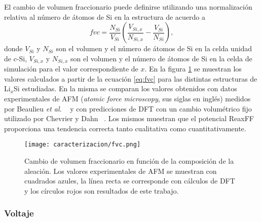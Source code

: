 El cambio de volumen fraccionario puede definirse utilizando una normalización 
relativa al número de átomos de Si en la estructura de acuerdo a
\begin{equation}\label{eq:fvc}
    fvc = \frac{N_{Si}}{V_{Si}} \left( \frac{V_{Si,x}}{N_{Si,x}} - \frac{V_{Si}}{N_{Si}} \right),
\end{equation}
donde $V_{Si}$ y $N_{Si}$ son el volumen y el número de átomos de Si en la celda
unidad de c-Si, $V_{Si,x}$ y $N_{Si,x}$ son el volumen y el número de átomos de Si
en la celda de simulación para el valor correspondiente de $x$. En la figura
\ref{fig:fvc} se muestran los valores calculados a partir de la ecuación 
\ref{eq:fvc} para las distintas estructuras de Li$_x$Si estudiadas. En la misma 
se comparan los valores obtenidos con datos experimentales de AFM (\textit{atomic 
force microscopy}, sus siglas en inglés) medidos por Beaulieu \textit{et al.} 
~\cite{beaulieu2003} y con predicciones de DFT con un cambio volumétrico fijo 
utilizado por Chevrier y Dahn ~\cite{chevrier2009}. Los mismos muestran que el
potencial ReaxFF proporciona una tendencia correcta tanto cualitativa como 
cuantitativamente.
\begin{figure}[th]
    \centering
    \texttt{[image: caracterizacion/fvc.png]}
    \caption{Cambio de volumen fraccionario en función de la composición de la 
    aleación. Los valores experimentales de AFM se muestran con cuadrados azules, 
    la línea recta se corresponde con cálculos de DFT y los círculos rojos son 
    resultados de este trabajo.}
    \label{fig:fvc}
\end{figure}

\subsubsection{Voltaje}

